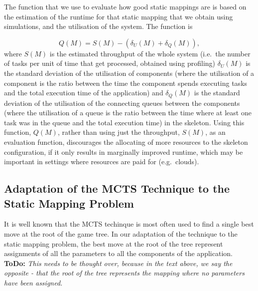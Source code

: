 \documentclass[smallextended]{svjour3}
\begin{document}


The function that we use to evaluate how good static
mappings are is based on the estimation of the runtime for that static
mapping that we obtain using simulations, and the utilisation of the
system. The function is


$$Q(M) = S(M) - (\delta_U(M) + \delta_Q(M)),$$
where $S(M)$ is the estimated throughput of the whole system (i.e.\
the number of tasks per unit of time that get processed, obtained using profiling)
$\delta_U(M)$ is the standard deviation of the utilisation of
components (where the utilisation of a component is the ratio between the time the component spends
executing tasks and the total execution time of the application) and $\delta_Q(M)$ is the standard deviation of
the utilisation of the connecting queues between the components (where
the utilisation of a queue is the ratio between the time where at least
one task was in the queue and the total execution time) in the skeleton. Using this function, $Q(M)$, rather than using
just the throughput, $S(M)$, as an evaluation function, discourages the allocating of more resources to the skeleton configuration, if
it only results in marginally improved runtime, which may be important
in settings where resources are paid for (e.g.\ clouds).

\subsection{Adaptation of the MCTS Technique to the Static Mapping
  Problem}

\noindent It is well known that the MCTS techinque is most often used
to find a single best move at the root of the game tree. In our
adaptation of the technique to the static mapping problem, the best
move at the root of the tree represent assignments of all the
parameters to all the components of the application. \textbf{ToDo: }
\emph{This needs to be thought over, because in the text above, we say the
opposite - that the root of the tree represents the mapping where no
parameters have been assigned.}
\end{document}
